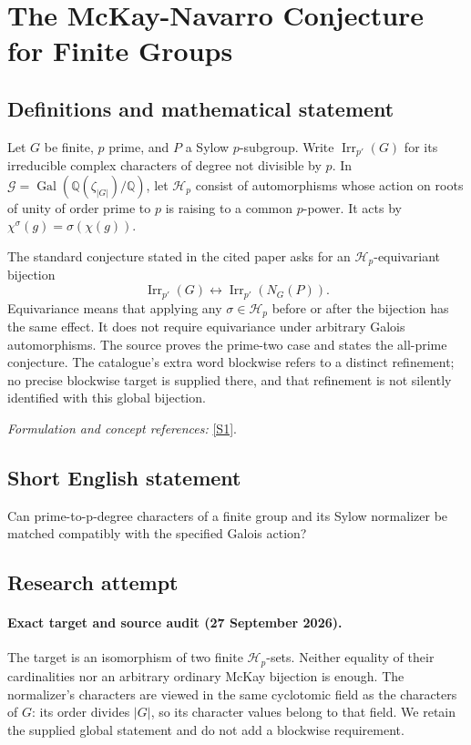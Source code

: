 \documentclass[11pt]{article}
\begin{document}
\section*{\texorpdfstring{The McKay-Navarro Conjecture for Finite Groups}{The McKay-Navarro Conjecture for Finite Groups}}\label{30006971}
\subsection{Definitions and mathematical statement}
Let $G$ be finite, $p$ prime, and $P$ a Sylow $p$-subgroup. Write $\operatorname{Irr}_{p'}(G)$ for its irreducible complex characters of degree not divisible by $p$. In $\mathcal G=\operatorname{Gal}({\mathbb{Q}}(\zeta_{|G|})/{\mathbb{Q}})$, let $\mathcal H_p$ consist of automorphisms whose action on roots of unity of order prime to $p$ is raising to a common $p$-power. It acts by $\chi^\sigma(g)=\sigma(\chi(g))$.

The standard conjecture stated in the cited paper asks for an $\mathcal H_p$-equivariant bijection
\[
 \operatorname{Irr}_{p'}(G)\longleftrightarrow
 \operatorname{Irr}_{p'}(N_G(P)).
\]
Equivariance means that applying any $\sigma\in\mathcal H_p$ before or after the bijection has the same effect. It does not require equivariance under arbitrary Galois automorphisms. The source proves the prime-two case and states the all-prime conjecture. The catalogue's extra word blockwise refers to a distinct refinement; no precise blockwise target is supplied there, and that refinement is not silently identified with this global bijection.
\par\smallskip\textit{Formulation and concept references:} \href{https://arxiv.org/abs/2211.14237}{[S1]}.

\subsection{Short English statement}
Can prime-to-p-degree characters of a finite group and its Sylow normalizer be matched compatibly with the specified Galois action?
\subsection{Research attempt}

\paragraph{Exact target and source audit (27 September 2026).}
The target is an isomorphism of two finite $\mathcal H_p$-sets. Neither
equality of their cardinalities nor an arbitrary ordinary McKay bijection
is enough. The normalizer's characters are viewed in the same cyclotomic
field as the characters of $G$: its order divides $|G|$, so its character
values belong to that field. We retain the supplied global statement and
do not add a blockwise requirement.
\end{document}
